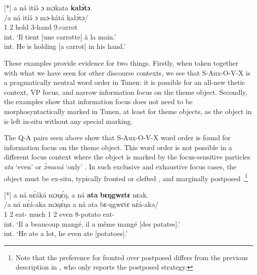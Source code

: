 \documentclass[output=paper,colorlinks,citecolor=brown
]{langscibook}
\begin{document}
\ex
[*]{
\label{carrotobjsvxo}
\glll
{\db}a ná itíə́ ɔ mɔkata \textbf{kalɔ́tɔ}. \\
/a ná itíə́ ɔ mɔ-kátá kalɔ́tɔ/ \\
{\db}1\SM{} \PST{}2{} hold \PREP{} 3-hand 9.carrot \\
\glt
int. `Il tient [une carrotte]\textsubscript{\FOC{}} à la main.' \\ int. He is holding [a carrot]\textsubscript{\FOC{}} in his hand.' \jambox*{[JO 1625] }
}

\z
\z

These examples provide evidence for two things. Firstly, when taken together with what we have seen for other discourse contexts, we see that S-Aux-O-V-X is a pragmatically neutral word order in Tunen: it is possible for an all-new thetic context, VP focus, and narrow information focus on the theme object. Secondly, the examples show that information focus does not need to be morphosyntactically marked in Tunen, at least for theme objects, as the object in  is  left in-situ without any special marking.\largerpage[2]

The Q-A pairs seen above show that S-Aux-O-V-X word order is found for information focus on the theme object. This word order is not possible in a different focus context where the object is marked by the focus-sensitive particles \textit{ata} `even'  or \textit{ɔ́maná} `only' . In such exclusive and exhaustive focus cases, the object must be ex-situ, typically fronted  or clefted , and marginally postposed .\footnote{Note that the preference for fronted over postposed differs from the previous description in \citet{Mous1997}, who only reports the postposed strategy.}

\ea
\label{evenpotatoset}
\ea
[*]{
\label{eveneatpotatoinsitu} 
\glll
{\db}a ná nɛ́áká mɔŋɛ́ŋ, a ná \textbf{ata} \textbf{bɛŋgwɛtɛ} nɛak. \\
/a ná nɛ́á-aka mɔŋɛ́ŋa a ná ata bɛ-ŋgwɛtɛ nɛ́á-aka/ \\
{\db}1\SM{} \PST{}2{} eat-\DUR{} much 1\SM{} \PST{}2{} even 8-potato eat-\DUR{} \\
\glt
int. `Il a beaucoup mangé, il a même mangé [des patates]\textsubscript{\FOC{}}.' \\ int. `He ate a lot, he even ate [potatoes]\textsubscript{\FOC{}}.' \jambox*{[PM (+DM) 2265] }
}
\end{document}
